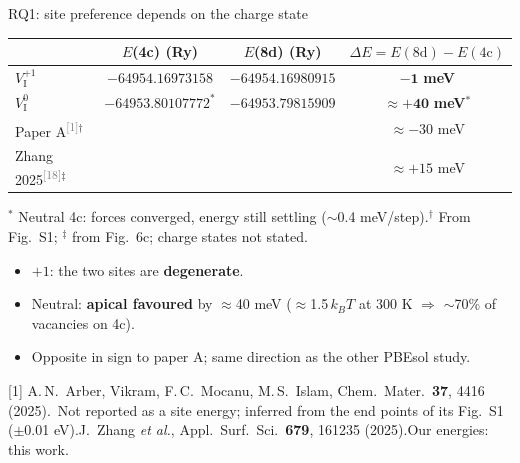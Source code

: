 \documentclass[aspectratio=169,10pt]{beamer}
\newcommand{\cit}[1]{\textsuperscript{\textcolor{gray}{[#1]}}}
\newcommand{\refs}[1]{\par\vfill\begingroup\tiny\color{gray}\raggedright #1\par\endgroup}
\newcommand{\RA}{[1] A.\,N.~Arber, Vikram, F.\,C.~Mocanu, M.\,S.~Islam, Chem.\ Mater.\ \textbf{37}, 4416 (2025).}
\newcommand{\RT}{[18] J.~Zhang \emph{et al.}, Appl.\ Surf.\ Sci.\ \textbf{679}, 161235 (2025).}
\begin{document}
\begin{frame}{RQ1: site preference depends on the charge state}
  \centering\small
  \begin{tabular}{lccc}
    \toprule
    & $E$(4c) (Ry) & $E$(8d) (Ry) & $\Delta E = E(\mathrm{8d}) - E(\mathrm{4c})$ \\
    \midrule
    $V_\mathrm{I}^{+1}$ & $-64954.16973158$ & $-64954.16980915$ & $\mathbf{-1}$ \textbf{meV} \\
    $V_\mathrm{I}^{0}$ & $-64953.80107772^{*}$ & $-64953.79815909$ & $\mathbf{\approx +40}$ \textbf{meV}$^{*}$ \\
    \midrule
    Paper A\cit{1}$^{\dagger}$ & & & $\approx -30$ meV \\
    Zhang 2025\cit{18}$^{\ddagger}$ & & & $\approx +15$ meV \\
    \bottomrule
  \end{tabular}

  {\scriptsize $^{*}$ Neutral 4c: forces converged, energy still settling ($\sim$0.4 meV/step).\quad $^{\dagger}$ From Fig.~S1; $^{\ddagger}$ from Fig.~6c; charge states not stated.}

  \vspace{0.4em}
  \raggedright\small
  \begin{itemize}
    \item $+1$: the two sites are \textbf{degenerate}.
    \item Neutral: \textbf{apical favoured} by $\approx$40 meV ($\approx$1.5\,$k_BT$ at 300 K $\Rightarrow$ $\sim$70\% of vacancies on 4c).
    \item Opposite in sign to paper A; same direction as the other PBEsol study.
  \end{itemize}
  \refs{\RA\ Not reported as a site energy; inferred from the end points of its Fig.~S1 ($\pm$0.01 eV).\quad \RT\quad Our energies: this work.}
\end{frame}
\end{document}
